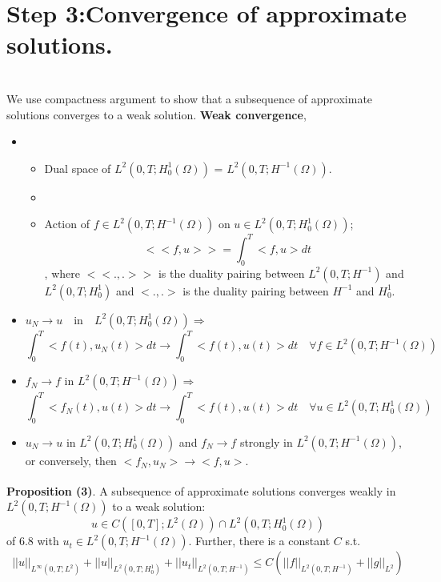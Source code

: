 \math\section*{ Step 3:Convergence of approximate solutions.}\\
We use compactness argument to show that a subsequence of approximate solutions converges to a weak solution.
\textbf{Weak convergence},\\
\begin{itemize}
\item \begin{itemize}
    \item Dual space of $L^2(0,T;H_0^1(\Omega))$ = $L^2(0,T;H^{-1}(\Omega))$.\\
    \item

\item Action of $f \in L^2(0,T;H^{-1}(\Omega))$ on $u  \in L^2(0,T;H_0^1(\Omega))$;
\begin{equation*}
    <<f,u>> = \int_0^T <f,u> dt
\end{equation*},
where $<<.,.>>$ is the duality pairing between $L^2(0,T;H^{-1})$ and $L^2(0,T;H_0^1)$ and $<.,.>$ is the duality pairing between $H^{-1}$ and $H_0^1$.
\end{itemize}

\item  $u_N \xrightarrow[]{} u \quad \text{in} \quad  L^2(0,T;H_0^1(\Omega)) \Rightarrow$\\
\begin{equation*}
\int_0^T<f(t),u_N(t)>dt \xrightarrow[]{}  \int_0^T<f(t),u(t)>dt \quad \forall  f \in L^2(0,T;H^{-1}(\Omega))
\end{equation*}

\item  $f_N \xrightarrow[]{} f$ in $ L^2(0,T;H^{-1}(\Omega)) \Rightarrow$\\
\begin{equation*}
      \int_0^T<f_{N}(t),u(t)>dt \xrightarrow[]{}  \int_0^T<f(t),u(t)>dt \quad \forall u \in L^2(0,T;H_0^1(\Omega))
\end{equation*}
\item  $u_N \xrightarrow[]{} u$ in $L^2(0,T;H_0^1(\Omega))$ and $f_N \xrightarrow[]{} f$ strongly in $ L^2(0,T;H^{-1}(\Omega))$, or conversely, then $<f_N,u_N> \xrightarrow[]{} <f,u>$.
\end{itemize}
\textbf{Proposition (3)}. A subsequence of approximate solutions converges weakly in \\$L^2(0,T;H^{-1}(\Omega))$ to a weak solution:
\[
    u \in C([0,T];L^2(\Omega)) \cap L^2(0,T;H_0^1(\Omega))
\]
of 6.8 with $u_t \in  L^2(0,T;H^{-1}(\Omega))$. Further, there is a constant $C$ s.t.
\[
    ||u||_{L^\infty(0,T;L^2)}+ ||u||_{L^2(0,T;H_0^1)}+
    ||u_t||_{L^2(0,T;H^{-1})}
    \leq  C \left( ||f||_{L^2(0,T;H^{-1})} + ||g||_{L^2} \right)
\]

